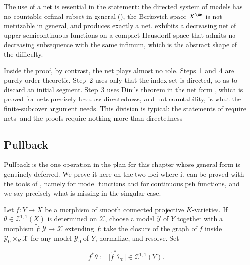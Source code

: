 \begin{remark}
\label{rem:ch21-decreasing-nets}
The use of a net is essential in the statement: the directed system of
models has no countable cofinal subset in general
(), the Berkovich space \(X^{\An}\) is
not metrizable in general, and 
produces exactly a net.   exhibits a
decreasing net of upper semicontinuous functions on a compact Hausdorff
space that admits no decreasing subsequence with the same infimum, which is
the abstract shape of the difficulty.

Inside the proof, by contrast, the net plays almost no role.  Steps~1
and~4 are purely order-theoretic.  Step~2 uses only that the index set is
directed, so as to discard an initial segment.  Step~3 uses Dini's theorem
in the net form , which is proved for nets precisely
because directedness, and not countability, is what the finite-subcover
argument needs.  This division is typical: the statements of
 require nets, and the proofs require nothing more than
directedness.
\end{remark}

\subsection{Pullback}
\label{sec:ch21-pullback}

Pullback is the one operation in the plan for this chapter whose general
form is genuinely deferred.  We prove it here on the two loci where it can
be proved with the tools of , namely for model
functions and for continuous psh functions, and we say precisely what is
missing in the singular case.

Let \(f:Y\to X\) be a morphism of smooth connected projective
\(K\)-varieties.  If \(\theta\in\mathcal Z^{1,1}(X)\) is determined on
\(\mathcal X\), choose a model \(\mathcal Y\) of \(Y\) together with a
morphism \(\tilde f:\mathcal Y\to\mathcal X\) extending \(f\): take the
closure of the graph of \(f\) inside \(\mathcal Y_0\times_R\mathcal X\) for
any model \(\mathcal Y_0\) of \(Y\), normalize, and resolve.  Set

\begin{equation}
\label{eq:ch21-pullback-form}
 f^*\theta:=\bigl[\tilde f^*\theta_{\mathcal X}\bigr]
 \in\mathcal Z^{1,1}(Y).
\end{equation}

